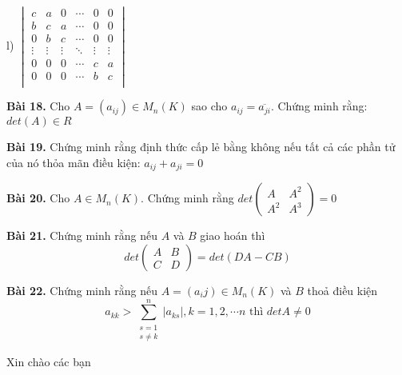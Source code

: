 \documentclass[12pt]{report}
\begin{document}
l) $\begin{vmatrix}
	c & a & 0 & \cdots & 0 & 0 \\
	b & c & a & \cdots & 0 & 0 \\
	0 & b & c & \cdots & 0 & 0 \\
	\vdots & \vdots & \vdots & \ddots & \vdots & \vdots \\
	0 & 0 & 0 & \cdots & c & a \\
	0 & 0 & 0 & \cdots & b & c \\
\end{vmatrix}$

\textbf{Bài 18.} Cho $A = \left( a_{ij}\right) \in M_n(K)$ sao cho $a_{ij} = \overline{a_{ji}}$. Chứng minh rằng: $det(A) \in R$

\textbf{Bài 19.} Chứng minh rằng định thức cấp lẻ bằng không nếu tất cả các phần tử của nó thỏa mãn điều kiện: $a_{ij} + a_{ji} = 0$

\textbf{Bài 20.} Cho $A \in M_n(K)$. Chứng minh rằng $det \begin{pmatrix}
	A & A^2 \\ A^2 & A^3 
\end{pmatrix} = 0$

\textbf{Bài 21.} Chứng minh rằng nếu $A$ và $B$ giao hoán thì 
\[ det \begin{pmatrix} A & B \\ C & D \end{pmatrix} = det(DA - CB) \]

\textbf{Bài 22.} Chứng minh rằng nếu $A = (a_ij) \in M_n(K)$ và $B$ thoả điều kiện \[ a_{kk} > \displaystyle \sum_{\substack{s=1 \\ s \neq k}}^n |a_{ks}|, k = 1, 2, \cdots n \text{ thì } detA \neq 0 \]

Xin chào các bạn
\end{document}
